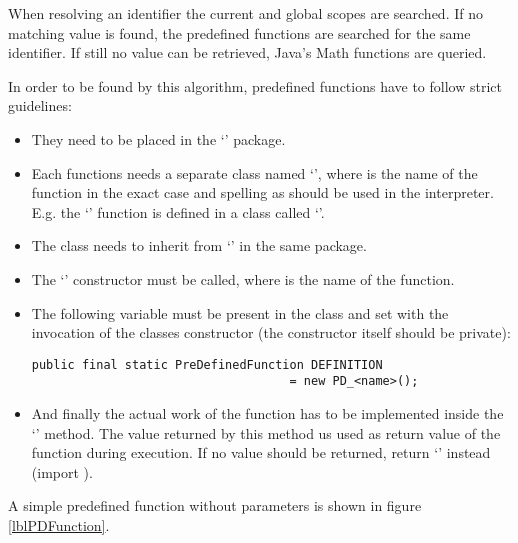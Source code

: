 When resolving an identifier the current and global scopes are searched. If no matching value is found, the predefined functions are searched for the same identifier. If still no value can be retrieved, Java's Math functions are queried.

In order to be found by this algorithm, predefined functions have to follow strict guidelines:

\begin{itemize}
	\item They need to be placed in the `' package.
	\item Each functions needs a separate class named `', where  is the name of the function in the exact case and spelling as should be used in the interpreter.\\
		E.g. the `' function is defined in a class called `'.
	\item The class needs to inherit from `' in the same package.
	\item The `' constructor must be called, where  is the name of the function.
	\item The following variable must be present in the class and set with the invocation of the classes constructor (the constructor itself should be private):
\begin{lstlisting}[frame=none,numbers=none]
public final static PreDefinedFunction DEFINITION
                                    = new PD_<name>();
\end{lstlisting}
	\item And finally the actual work of the function has to be implemented inside the `' method. The value returned by this method us used as return value of the function during execution. If no value should be returned, return `' instead (import ).

\end{itemize}

A simple predefined function without parameters is shown in figure \ref{lblPDFunction}.



